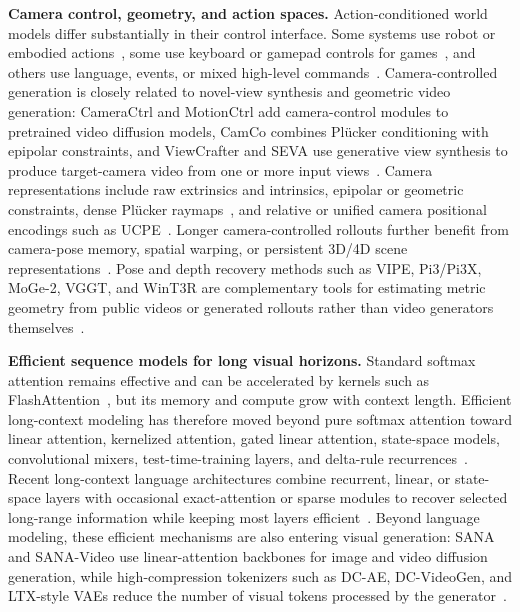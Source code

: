 \noindent\textbf{Camera control, geometry, and action spaces.}
Action-conditioned world models differ substantially in their control interface.
Some systems use robot or embodied actions~\citep{dreamzero,dreamdojo}, some use keyboard or gamepad controls for games~\citep{genie3,gamegen,matrixgame,matrixgame3}, and others use language, events, or mixed high-level commands~\citep{unisim,yume}.
Camera-controlled generation is closely related to novel-view synthesis and geometric video generation: CameraCtrl and MotionCtrl add camera-control modules to pretrained video diffusion models, CamCo combines Pl\"ucker conditioning with epipolar constraints, and ViewCrafter and SEVA use generative view synthesis to produce target-camera video from one or more input views~\citep{cameractrl,motionctrl,camco,viewcrafter,seva}.
Camera representations include raw extrinsics and intrinsics, epipolar or geometric constraints, dense Pl\"ucker raymaps~\citep{plucker_lfn}, and relative or unified camera positional encodings such as UCPE~\citep{ucpe,li2025cameras}.
Longer camera-controlled rollouts further benefit from camera-pose memory, spatial warping, or persistent 3D/4D scene representations~\citep{aether,ucm,worldcam,captain_safari,deepverse,versecrafter,hy_world2,inspatio_world}.
Pose and depth recovery methods such as VIPE, Pi3/Pi3X, MoGe-2, VGGT, and WinT3R are complementary tools for estimating metric geometry from public videos or generated rollouts rather than video generators themselves~\citep{vipe,pi3x,moge2,vggt,wint3r}.

\noindent\textbf{Efficient sequence models for long visual horizons.}
Standard softmax attention remains effective and can be accelerated by kernels such as FlashAttention~\citep{flash_attention2}, but its memory and compute grow with context length.
Efficient long-context modeling has therefore moved beyond pure softmax attention toward linear attention, kernelized attention, gated linear attention, state-space models, convolutional mixers, test-time-training layers, and delta-rule recurrences~\citep{linear_attention,performer,gla,rwkv,retnet,hyena,mamba,mamba2,ttt_layers,gated_deltanet}.
Recent long-context language architectures combine recurrent, linear, or state-space layers with occasional exact-attention or sparse modules to recover selected long-range information while keeping most layers efficient~\citep{qwen3,qwen3_next,kimi_linear,kimi_k2}.
Beyond language modeling, these efficient mechanisms are also entering visual generation: SANA and SANA-Video use linear-attention backbones for image and video diffusion generation, while high-compression tokenizers such as DC-AE, DC-VideoGen, and LTX-style VAEs reduce the number of visual tokens processed by the generator~\citep{sana,chen2025sana,dc_ae,dc-video-gen,ltx_video,ltx2}.

